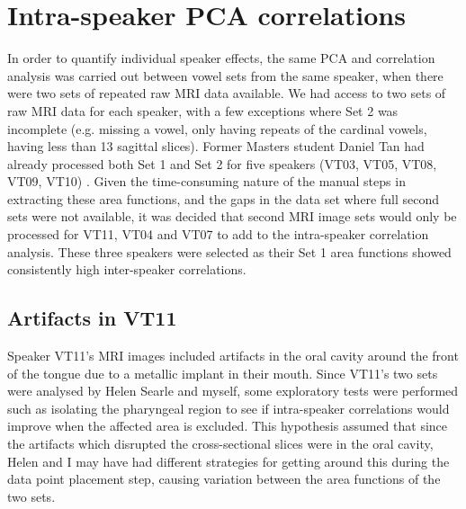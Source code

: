 \section{Intra-speaker PCA correlations}

In order to quantify individual speaker effects, the same PCA and correlation analysis was carried out between vowel sets from the same speaker, when there were two sets of repeated raw MRI data available. We had access to two sets of raw MRI data for each speaker, with a few exceptions where Set 2 was incomplete (e.g. missing a vowel, only having repeats of the cardinal vowels, having less than 13 sagittal slices). Former Masters student Daniel Tan had already processed both Set 1 and Set 2 for five speakers (VT03, VT05, VT08, VT09, VT10) \cite{daniel}. Given the time-consuming nature of the manual steps in extracting these area functions, and the gaps in the data set where full second sets were not available, it was decided that second MRI image sets would only be processed for VT11, VT04 and VT07 to add to the intra-speaker correlation analysis. These three speakers were selected as their Set 1 area functions showed consistently high inter-speaker correlations.

\subsection{Artifacts in VT11}

Speaker VT11's MRI images included artifacts in the oral cavity around the front of the tongue due to a metallic implant in their mouth. Since VT11's two sets were analysed by Helen Searle \cite{helen} and myself, some exploratory tests were performed such as isolating the pharyngeal region to see if intra-speaker correlations would improve when the affected area is excluded. This hypothesis assumed that since the artifacts which disrupted the cross-sectional slices were in the oral cavity, Helen and I may have had different strategies for getting around this during the data point placement step, causing variation between the area functions of the two sets.